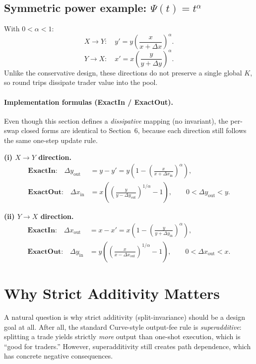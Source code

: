 \documentclass[11pt]{article}
\theoremstyle{definition}
\theoremstyle{remark}
\newcommand{\dx}{\Delta x}
\newcommand{\dy}{\Delta y}
\begin{document}
\subsection{Symmetric power example: $\Psi(t)=t^\alpha$}

With $0<\alpha<1$:
\[
X\to Y:\quad y' = y\left(\frac{x}{x+\dx}\right)^\alpha.
\]
\[
Y\to X:\quad x' = x\left(\frac{y}{y+\dy}\right)^\alpha.
\]
Unlike the conservative design, these directions do not preserve a single global $K$, so round trips dissipate trader value into the pool.


\paragraph{Implementation formulas (ExactIn / ExactOut).}
Even though this section defines a \emph{dissipative} mapping (no invariant), the per-swap
closed forms are identical to Section~6, because each direction still follows the same one-step
update rule.

\textbf{(i) \(X \to Y\) direction.}
\begin{align}
\textbf{ExactIn:}\quad
\dy_{\mathrm{out}}
&= y - y'
= y\left(1 - \left(\frac{x}{x+\dx_{\mathrm{in}}}\right)^{\alpha}\right),
\\[4pt]
\textbf{ExactOut:}\quad
\dx_{\mathrm{in}}
&= x\left(\left(\frac{y}{y-\dy_{\mathrm{out}}}\right)^{1/\alpha}-1\right),
\qquad 0<\dy_{\mathrm{out}}<y.
\end{align}

\textbf{(ii) \(Y \to X\) direction.}
\begin{align}
\textbf{ExactIn:}\quad
\dx_{\mathrm{out}}
&= x - x'
= x\left(1 - \left(\frac{y}{y+\dy_{\mathrm{in}}}\right)^{\alpha}\right),
\\[4pt]
\textbf{ExactOut:}\quad
\dy_{\mathrm{in}}
&= y\left(\left(\frac{x}{x-\dx_{\mathrm{out}}}\right)^{1/\alpha}-1\right),
\qquad 0<\dx_{\mathrm{out}}<x.
\end{align}

\section{Why Strict Additivity Matters}\label{sec:why-sa}

A natural question is why strict additivity (split-invariance) should be a design goal at all.
After all, the standard Curve-style output-fee rule is \emph{superadditive}: splitting a trade yields strictly \emph{more} output than one-shot execution, which is ``good for traders.''
However, superadditivity still creates path dependence, which has concrete negative consequences.
\end{document}
